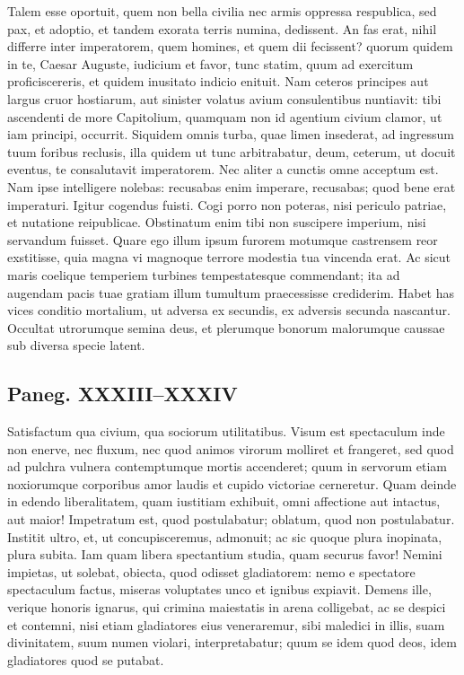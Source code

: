 Talem esse oportuit, quem non bella civilia nec armis oppressa respublica, sed pax, et adoptio, et tandem exorata terris numina, dedissent. An fas erat, nihil differre inter imperatorem, quem homines, et quem dii fecissent? quorum quidem in te, Caesar Auguste, iudicium et favor, tunc statim, quum ad exercitum proficiscereris, et quidem inusitato indicio enituit. Nam ceteros principes aut largus cruor hostiarum, aut sinister volatus avium consulentibus nuntiavit: tibi ascendenti de more Capitolium, quamquam non id agentium civium clamor, ut iam principi, occurrit. Siquidem omnis turba, quae limen insederat, ad ingressum tuum foribus reclusis, illa quidem ut tunc arbitrabatur, deum, ceterum, ut docuit eventus, te consalutavit imperatorem. Nec aliter a cunctis omne acceptum est. Nam ipse intelligere nolebas: recusabas enim imperare, recusabas; quod bene erat imperaturi. Igitur cogendus fuisti. Cogi porro non poteras, nisi periculo patriae, et nutatione reipublicae. Obstinatum enim tibi non suscipere imperium, nisi servandum fuisset. Quare ego illum ipsum furorem motumque castrensem reor exstitisse, quia magna vi magnoque terrore modestia tua vincenda erat. Ac sicut maris coelique temperiem turbines tempestatesque commendant; ita ad augendam pacis tuae gratiam illum tumultum praecessisse crediderim. Habet has vices conditio mortalium, ut adversa ex secundis, ex adversis secunda nascantur. Occultat utrorumque semina deus, et plerumque bonorum malorumque caussae sub diversa specie latent.

\subsection*{Paneg. XXXIII–XXXIV}

Satisfactum qua civium, qua sociorum utilitatibus. Visum est spectaculum inde non enerve, nec fluxum, nec quod animos virorum molliret et frangeret, sed quod ad pulchra vulnera contemptumque mortis accenderet; quum in servorum etiam noxiorumque corporibus amor laudis et cupido victoriae cerneretur. Quam deinde in edendo liberalitatem, quam iustitiam exhibuit, omni affectione aut intactus, aut maior! Impetratum est, quod postulabatur; oblatum, quod non postulabatur. Institit ultro, et, ut concupisceremus, admonuit; ac sic quoque plura inopinata, plura subita. Iam quam libera spectantium studia, quam securus favor! Nemini impietas, ut solebat, obiecta, quod odisset gladiatorem: nemo e spectatore spectaculum factus, miseras voluptates unco et ignibus expiavit. Demens ille, verique honoris ignarus, qui crimina maiestatis in arena colligebat, ac se despici et contemni, nisi etiam gladiatores eius veneraremur, sibi maledici in illis, suam divinitatem, suum numen violari, interpretabatur; quum se idem quod deos, idem gladiatores quod se putabat.

